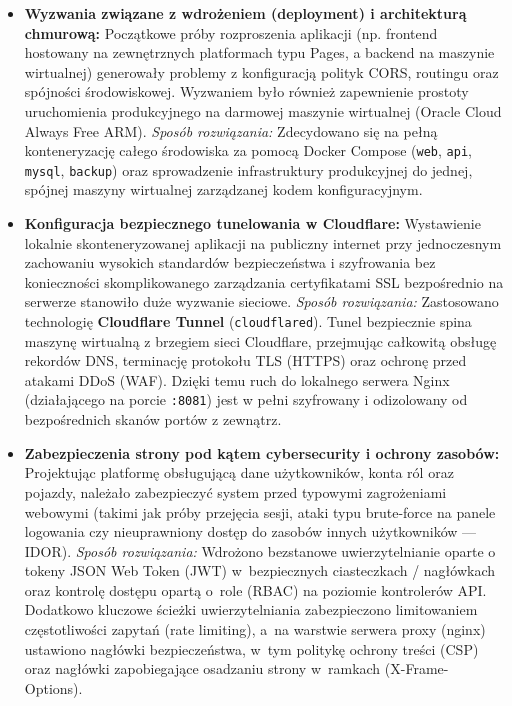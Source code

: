 \documentclass{sprz}
\begin{document}
\begin{itemize}
    \item \textbf{Wyzwania związane z wdrożeniem (deployment) i architekturą chmurową:} 
    Początkowe próby rozproszenia aplikacji (np. frontend hostowany na zewnętrznych platformach typu Pages, a backend na maszynie wirtualnej) generowały problemy z konfiguracją polityk CORS, routingu oraz spójności środowiskowej. Wyzwaniem było również zapewnienie prostoty uruchomienia produkcyjnego na darmowej maszynie wirtualnej (Oracle Cloud Always Free ARM). 
    \textit{Sposób rozwiązania:} Zdecydowano się na pełną konteneryzację całego środowiska za pomocą Docker Compose (\texttt{web}, \texttt{api}, \texttt{mysql}, \texttt{backup}) oraz sprowadzenie infrastruktury produkcyjnej do jednej, spójnej maszyny wirtualnej zarządzanej kodem konfiguracyjnym.

    \item \textbf{Konfiguracja bezpiecznego tunelowania w Cloudflare:} 
    Wystawienie lokalnie skonteneryzowanej aplikacji na publiczny internet przy jednoczesnym zachowaniu wysokich standardów bezpieczeństwa i szyfrowania bez konieczności skomplikowanego zarządzania certyfikatami SSL bezpośrednio na serwerze stanowiło duże wyzwanie sieciowe.
    \textit{Sposób rozwiązania:} Zastosowano technologię \textbf{Cloudflare Tunnel} (\texttt{cloudflared}). Tunel bezpiecznie spina maszynę wirtualną z brzegiem sieci Cloudflare, przejmując całkowitą obsługę rekordów DNS, terminację protokołu TLS (HTTPS) oraz ochronę przed atakami DDoS (WAF). Dzięki temu ruch do lokalnego serwera Nginx (działającego na porcie \texttt{:8081}) jest w pełni szyfrowany i odizolowany od bezpośrednich skanów portów z zewnątrz.

    \item \textbf{Zabezpieczenia strony pod kątem cybersecurity i ochrony zasobów:} 
    Projektując platformę obsługującą dane użytkowników, konta ról oraz pojazdy, należało zabezpieczyć system przed typowymi zagrożeniami webowymi (takimi jak próby przejęcia sesji, ataki typu brute-force na panele logowania czy nieuprawniony dostęp do zasobów innych użytkowników --- IDOR).
    \textit{Sposób rozwiązania:} Wdrożono bezstanowe uwierzytelnianie oparte o tokeny JSON Web Token (JWT) w~bezpiecznych ciasteczkach / nagłówkach oraz kontrolę dostępu opartą o~role (RBAC) na poziomie kontrolerów API. Dodatkowo kluczowe ścieżki uwierzytelniania zabezpieczono limitowaniem częstotliwości zapytań (rate limiting), a~na warstwie serwera proxy (nginx) ustawiono nagłówki bezpieczeństwa, w~tym politykę ochrony treści (CSP) oraz nagłówki zapobiegające osadzaniu strony w~ramkach (X-Frame-Options).
\end{itemize}
\end{document}
